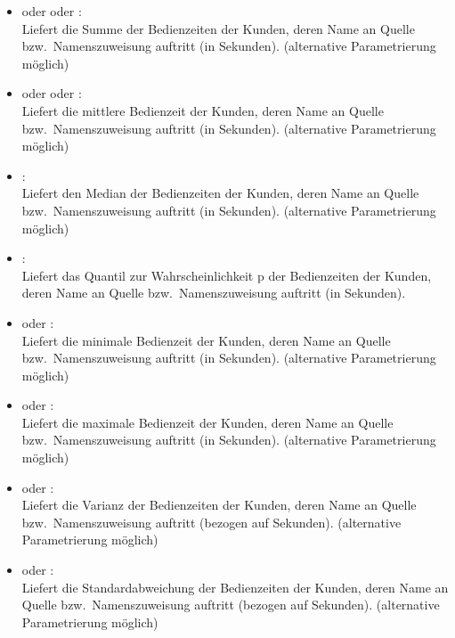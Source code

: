 \begin{itemize}

\item
{} oder  oder :\\
Liefert die Summe der Bedienzeiten der Kunden, deren Name an Quelle bzw.\ Namenszuweisung  auftritt (in Sekunden).
(alternative Parametrierung möglich)

\item
{} oder  oder :\\
Liefert die mittlere Bedienzeit der Kunden, deren Name an Quelle bzw.\ Namenszuweisung  auftritt (in Sekunden).
(alternative Parametrierung möglich)

\item
{}:\\
Liefert den Median der Bedienzeiten der Kunden, deren Name an Quelle bzw.\ Namenszuweisung  auftritt (in Sekunden).
(alternative Parametrierung möglich)

\item
{}:\\
Liefert das Quantil zur Wahrscheinlichkeit p der Bedienzeiten der Kunden, deren Name an Quelle bzw.\ Namenszuweisung  auftritt (in Sekunden).

\item
{} oder :\\
Liefert die minimale Bedienzeit der Kunden, deren Name an Quelle bzw.\ Namenszuweisung  auftritt (in Sekunden).
(alternative Parametrierung möglich)

\item
{} oder :\\
Liefert die maximale Bedienzeit der Kunden, deren Name an Quelle bzw.\ Namenszuweisung  auftritt (in Sekunden).
(alternative Parametrierung möglich)

\item
{} oder :\\
Liefert die Varianz der Bedienzeiten der Kunden, deren Name an Quelle bzw.\ Namenszuweisung  auftritt (bezogen auf Sekunden).
(alternative Parametrierung möglich)

\item
{} oder :\\
Liefert die Standardabweichung der Bedienzeiten der Kunden, deren Name an Quelle bzw.\ Namenszuweisung  auftritt (bezogen auf Sekunden).
(alternative Parametrierung möglich)


\end{itemize}
